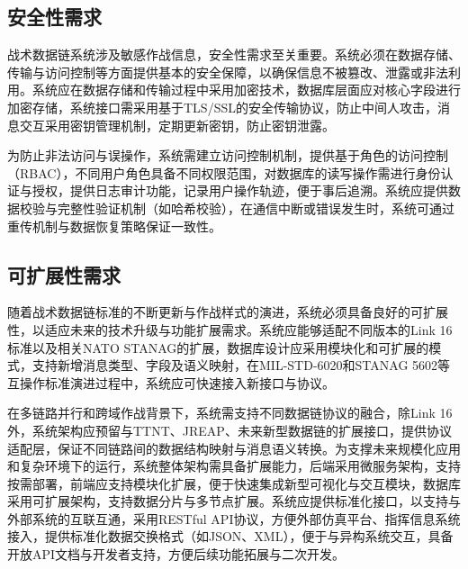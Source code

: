 \subsection{安全性需求}
战术数据链系统涉及敏感作战信息，安全性需求至关重要。系统必须在数据存储、传输与访问控制等方面提供基本的安全保障，以确保信息不被篡改、泄露或非法利用\cite{Collins_TTNT_immersion_2020}。系统应在数据存储和传输过程中采用加密技术，数据库层面应对核心字段进行加密存储，系统接口需采用基于TLS/SSL的安全传输协议，防止中间人攻击，消息交互采用密钥管理机制，定期更新密钥，防止密钥泄露\cite{Euromids_2025_contract}。

为防止非法访问与误操作，系统需建立访问控制机制，提供基于角色的访问控制（RBAC），不同用户角色具备不同权限范围，对数据库的读写操作需进行身份认证与授权，提供日志审计功能，记录用户操作轨迹，便于事后追溯\cite{GovConWire_Euromids_2025}。系统应提供数据校验与完整性验证机制（如哈希校验），在通信中断或错误发生时，系统可通过重传机制与数据恢复策略保证一致性\cite{musumeci_2014_ietrsn_pulseblank,borio_2013_ietspr_pulseblanking,houdzoumis2009_jn,wu_2016_taes_dme_wp,huo_2015_ieeecl_meb,huo_2015_comex_mixed_interference,mitch_2016_nav_chirp_geolocation,vandermerwe_2023_nav_mpanf}。

\subsection{可扩展性需求}
随着战术数据链标准的不断更新与作战样式的演进，系统必须具备良好的可扩展性，以适应未来的技术升级与功能扩展需求\cite{CJCS_Manuals_Library}。系统应能够适配不同版本的Link 16标准以及相关NATO STANAG的扩展，数据库设计应采用模块化和可扩展的模式，支持新增消息类型、字段及语义映射，在MIL-STD-6020和STANAG 5602等互操作标准演进过程中，系统应可快速接入新接口与协议\cite{CJCS_Instructions_Library,ASSIST_3011_2023}。

在多链路并行和跨域作战背景下，系统需支持不同数据链协议的融合，除Link 16外，系统架构应预留与TTNT、JREAP、未来新型数据链的扩展接口，提供协议适配层，保证不同链路间的数据结构映射与消息语义转换\cite{ASSIST_6020_2025,qin2013_gpssol}。为支撑未来规模化应用和复杂环境下的运行，系统整体架构需具备扩展能力，后端采用微服务架构，支持按需部署，前端应支持模块化扩展，便于快速集成新型可视化与交互模块，数据库采用可扩展架构，支持数据分片与多节点扩展\cite{fried_loeliger1979_navigation}。系统应提供标准化接口，以支持与外部系统的互联互通，采用RESTful API协议，方便外部仿真平台、指挥信息系统接入，提供标准化数据交换格式（如JSON、XML），便于与异构系统交互，具备开放API文档与开发者支持，方便后续功能拓展与二次开发\cite{baruffa2013_jsps}。
